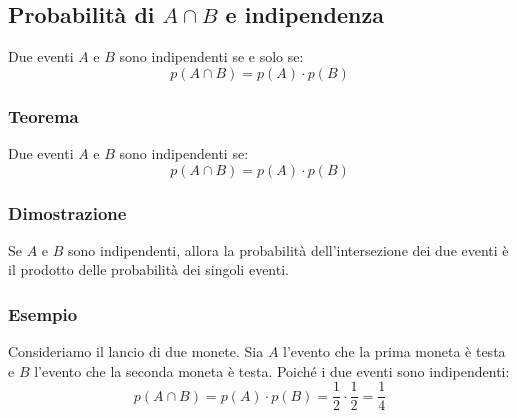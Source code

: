 \documentclass{article}
\begin{document}

\newpage
\subsection{Probabilità di \(A \cap B\) e indipendenza}
Due eventi \(A\) e \(B\) sono indipendenti se e solo se:
\[
p(A \cap B) = p(A) \cdot p(B)
\]

\subsubsection{Teorema}
Due eventi \(A\) e \(B\) sono indipendenti se:
\[
p(A \cap B) = p(A) \cdot p(B)
\]

\subsubsection{Dimostrazione}
Se \(A\) e \(B\) sono indipendenti, allora la probabilità dell'intersezione dei due eventi è il prodotto delle probabilità dei singoli eventi.

\subsubsection{Esempio}
Consideriamo il lancio di due monete. Sia \(A\) l'evento che la prima moneta è testa e \(B\) l'evento che la seconda moneta è testa. Poiché i due eventi sono indipendenti:
\[
p(A \cap B) = p(A) \cdot p(B) = \frac{1}{2} \cdot \frac{1}{2} = \frac{1}{4}
\]

\end{document}
